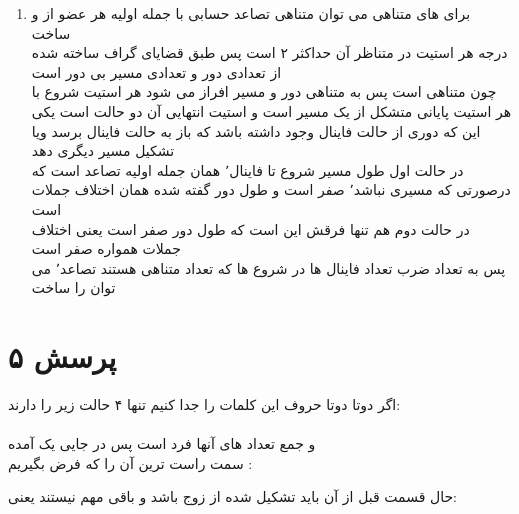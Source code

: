 \documentclass[a4paper]{article}
\begin{document}
\begin{enumerate}
\item{}
برای
های متناهی می توان متناهی تصاعد حسابی با جمله اولیه هر عضو از
و
ساخت\\
درجه هر استیت در
متناظر آن حداکثر ۲ است
پس طبق قضایای گراف ساخته شده از تعدادی دور و تعدادی مسیر بی دور است
\\
چون 
متناهی است پس به متناهی دور و مسیر افراز می شود
هر استیت شروع با هر استیت پایانی متشکل از یک مسیر است و استیت انتهایی آن دو حالت است
یکی این که دوری از حالت فاینال وجود داشته باشد که باز به حالت فاینال برسد ویا تشکیل مسیر دیگری دهد
\\
در حالت اول طول مسیر شروع تا فاینال٬ همان جمله اولیه تصاعد است که درصورتی که مسیری نباشد٬ صفر است
 و طول دور گفته شده همان اختلاف جملات است
 \\
 در حالت دوم هم تنها فرقش این است که طول دور صفر است یعنی اختلاف جملات همواره صفر است
 \\
 پس به تعداد ضرب تعداد فاینال ها در شروع ها که تعداد متناهی هستند
تصاعد٬ می توان 
را ساخت
\end{enumerate}

\section*{پرسش ۵}
اگر دوتا دوتا حروف این کلمات را جدا کنیم تنها ۴ حالت زیر را دارند:
\\
\\
و جمع تعداد 
های آنها فرد است پس در جایی یک
آمده\\
سمت راست ترین آن را که فرض بگیریم :
\\

حال قسمت قبل از آن باید تشکیل شده از زوج 
باشد و باقی مهم نیستند یعنی:
\\
\\
\end{document}
